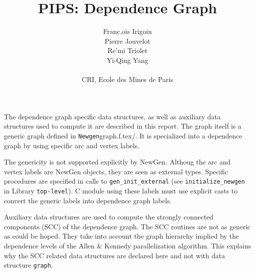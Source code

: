 

\title{PIPS: Dependence Graph}
\author{Franc,ois Irigoin \\
    Pierre Jouvelot \\
    Re'mi Triolet\\
    Yi-Qing Yang \\
\\
    CRI, Ecole des Mines de Paris}

\newcommand{\domain}[2]{\paragraph{{#1}}\paragraph{}{#2}}


\maketitle


The dependence graph specific data structures, as well as auxiliary data
structures used to compute it are described in this report. The graph
itself is a generic graph defined in \verb/Newgen/graph.f.tex/. It is
specialized into a dependence graph by using specific arc and vertex
labels. 

The genericity is not supported explicitly by NewGen. Althoug the arc
and vertex labels are NewGen objects, they are seen as external
types. Specific procedures are specified in calls to
\verb/gen_init_external/ (see \verb/initialize_newgen/ in Library
\verb/top-level/). C module using these labels must use explicit
casts to convert the generic labels into dependence graph labels.

Auxiliary data structures are used to compute the strongly connected
components (SCC) of the dependence graph. The SCC routines are not as
generic as could be hoped. They take into account the graph hierarchy
implied by the dependence levels of the Allen \& Kennedy parallelization
algorithm. This explains why the SCC related data structures are
declared here and not with data structure \verb/graph/.

\iffalse
Les structures de donne'es suivantes sont utilise'es par la phase de
construction du graphe des de'pendances. Elles sont construites en
utilisant les structures de donne'es \verb+statement+ et \verb+effect+
qui ont e'te' de'finies dans la repre'sentation interne, ainsi que la
structure de donne'es ge'ne'riques \verb+vertex+ qui fait partie du
package {\em graph}.
\fi


